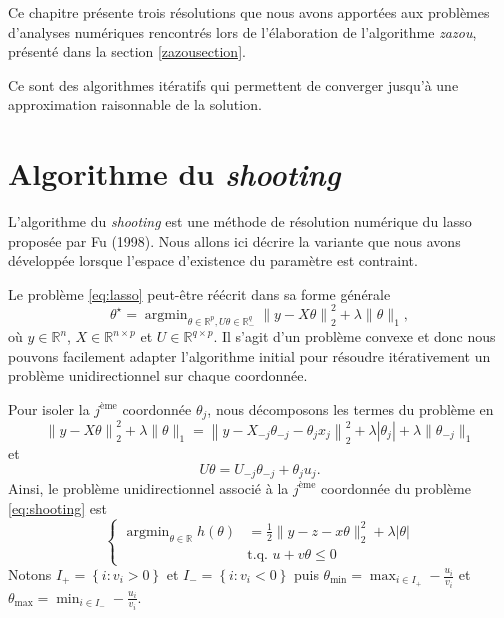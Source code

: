 \documentclass[12pt,a4paper]{reedthesis}
\newcommand \RR {\mathbb{R}}
\newcommand \param {\theta}
\DeclareMathOperator*{\argmin}{argmin}
\theoremstyle{definition}
\theoremstyle{definition}
\theoremstyle{definition}
\theoremstyle{remark}
\begin{document}
Ce chapitre présente trois résolutions que nous avons apportées aux problèmes d'analyses numériques rencontrés lors de l'élaboration de l'algorithme \emph{zazou}, présenté dans la section \ref{zazousection}.

Ce sont des algorithmes itératifs qui permettent de converger jusqu'à une approximation raisonnable de la solution.

\hypertarget{shooting}{%
\section{\texorpdfstring{Algorithme du \emph{shooting}}{Algorithme du shooting}}\label{shooting}}

L'algorithme du \emph{shooting} est une méthode de résolution numérique du lasso proposée par Fu (1998). Nous allons ici décrire la variante que nous avons développée lorsque l'espace d'existence du paramètre est contraint.

Le problème \eqref{eq:lasso} peut-être réécrit dans sa forme générale
\begin{equation}
\label{eq:shooting}
\param^\star = \argmin_{\param \in \RR^p,U\param \in \RR^q_{-}} \left\|y - X\param\right\|_2^2 + \lambda \|\param\|_1,
\end{equation}
où \(y \in \RR^n\), \(X \in \RR^{n\times p}\) et \(U \in \RR^{q \times p}\). Il s'agit d'un problème convexe et donc nous pouvons facilement adapter l'algorithme initial pour résoudre itérativement un problème unidirectionnel sur chaque coordonnée.

Pour isoler la \(j^{\text{ème}}\) coordonnée \(\param_j\), nous décomposons les termes du problème en\\
\begin{equation*}
\left\|y - X\param\right\|_2^2 + \lambda \|\param\|_1 = \left\|y - X_{-j}\param_{-j} - \param_j x_j\right\|_2^2 + \lambda |\param_j| + \lambda \|\param_{-j}\|_1
\end{equation*}
et
\begin{equation*}
U\param = U_{-j}\param_{-j} + \param_j u_j.
\end{equation*}
Ainsi, le problème unidirectionnel associé à la \(j^{\text{ème}}\) coordonnée du problème \eqref{eq:shooting} est
\begin{equation}
\label{eq:unidirectionnel}
\left\{
  \begin{aligned}
    \argmin_{\param \in \RR} h(\param) & = \frac{1}{2} \|y - z - x\param\|^2_2 + \lambda |\param| \\
    & \text{t.q. } u + v\param \leq 0
  \end{aligned}
\right.
\end{equation}
Notons \(I_+ = \left\{ i : v_i > 0 \right\}\) et \(I_- = \left\{i : v_i < 0 \right\}\) puis \(\param_{\min} = \max_{i \in I_+} -\frac{u_i}{v_i}\) et \(\param_{\max} = \min_{i \in I_-} -\frac{u_i}{v_i}\).
\end{document}
